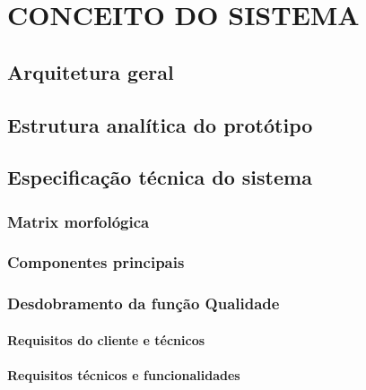 \chapter{CONCEITO DO SISTEMA}
\label{chap:sist}

\section{Arquitetura geral}
\label{sec:arqger}

\section{Estrutura analítica do protótipo}
\label{sec:eap}

\section{Especificação técnica do sistema}
\label{sec:esptec}

\subsection{Matrix morfológica}
\label{sec:mtxmorf}

\subsection{Componentes principais}
\label{sec:compprinc}

\subsection{Desdobramento da função Qualidade}
\label{sec:qfd}

\subsubsection{Requisitos do cliente e técnicos}
\label{sec:reqclitec}

\subsubsection{Requisitos técnicos e funcionalidades}
\label{sec:reqtecfunc}


